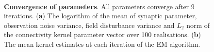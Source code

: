 \documentclass[]{article}
\begin{document}
\begin{figure}[!ht]
\centering
{}\\
\centering
\caption{{\bf Convergence of parameters}. All parameters converge after 9 iterations. (\textbf a) The logarithm of the mean of synaptic parameter, observation noise variance, field disturbance variance and $L_2$ norm of the connectivity kernel parameter vector over 100 realisations. (\textbf b) The mean kernel estimates at each iteration of the EM algorithm.}
\label{fig:EM-ParameterConvergence}
\end{figure}
\end{document}
